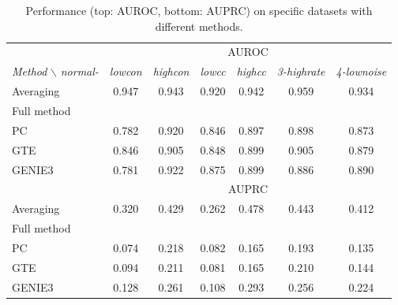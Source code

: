 \documentclass[wcp]{jmlr}
\begin{document}
\begin{table}[h]
\caption{Performance (top: AUROC, bottom: AUPRC) on specific datasets with different methods.}
\label{tab:results_appendix}
\centering
\small
\begin{tabular}{| l | c c c c c c |}
\hline
& \multicolumn{6}{c|}{AUROC}\\
\textit{Method} $\backslash$ \textit{normal-} & \textit{lowcon} & \textit{highcon} & \textit{lowcc} & \textit{highcc} & \textit{3-highrate} & \textit{4-lownoise} \\
\hline
\hline
Averaging     & 0.947 & 0.943 & 0.920 & 0.942 & 0.959 & 0.934 \\
Full method   &  &  &  & & &\\
PC & 0.782 & 0.920 &  0.846 & 0.897  & 0.898  & 0.873 \\
GTE & 0.846 & 0.905 & 0.848 & 0.899 & 0.905 & 0.879\\
GENIE3 & 0.781 &  0.922 & 0.875 & 0.899 & 0.886 &  0.890 \\ \hline
& \multicolumn{6}{c|}{AUPRC}\\ \hline
Averaging     & 0.320 & 0.429 & 0.262 & 0.478 & 0.443 & 0.412 \\
Full method   &  &  &  & & &\\
PC & 0.074 & 0.218 & 0.082 & 0.165  & 0.193 & 0.135 \\
GTE & 0.094 & 0.211 & 0.081 & 0.165 & 0.210 & 0.144\\
GENIE3 & 0.128 & 0.261 & 0.108 & 0.293 & 0.256 & 0.224\\ \hline
\end{tabular}
\end{table}
\end{document}
